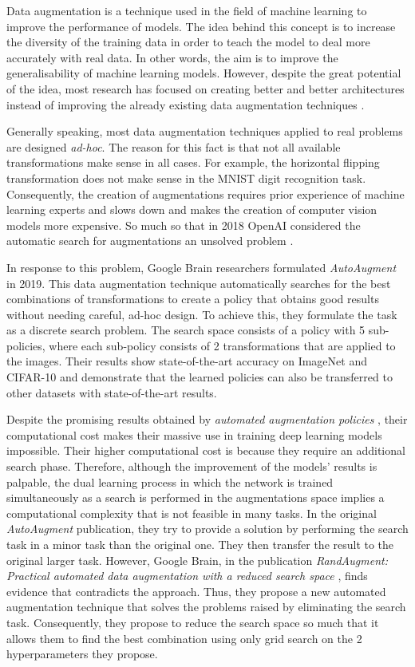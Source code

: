 Data augmentation is a technique used in the field of machine learning to improve the performance of models. The idea behind this concept is to increase the diversity of the training data in order to teach the model to deal more accurately with real data. In other words, the aim is to improve the generalisability of machine learning models. However, despite the great potential of the idea, most research has focused on creating better and better architectures instead of improving the already existing data augmentation techniques \cite{cubuk2018autoaugment}.

Generally speaking, most data augmentation techniques applied to real problems are designed \textit{ad-hoc}. The reason for this fact is that not all available transformations make sense in all cases. For example, the horizontal flipping transformation does not make sense in the MNIST digit recognition task. Consequently, the creation of augmentations requires prior experience of machine learning experts and slows down and makes the creation of computer vision models more expensive. So much so that in 2018 OpenAI considered the automatic search for augmentations an unsolved problem \cite{requestsresearch}.

In response to this problem, Google Brain researchers formulated \textit{AutoAugment} \cite{cubuk2018autoaugment} in 2019. This data augmentation technique automatically searches for the best combinations of transformations to create a policy that obtains good results without needing careful, ad-hoc design. To achieve this, they formulate the task as a discrete search problem. The search space consists of a policy with 5 sub-policies, where each sub-policy consists of 2 transformations that are applied to the images. Their results show state-of-the-art accuracy on ImageNet and CIFAR-10 and demonstrate that the learned policies can also be transferred to other datasets with state-of-the-art results.

Despite the promising results obtained by \textit{automated augmentation policies} \cite{cubuk2018autoaugment}, their computational cost makes their massive use in training deep learning models impossible. Their higher computational cost is because they require an additional search phase. Therefore, although the improvement of the models' results is palpable, the dual learning process in which the network is trained simultaneously as a search is performed in the augmentations space implies a computational complexity that is not feasible in many tasks. In the original \textit{AutoAugment} publication, they try to provide a solution by performing the search task in a minor task than the original one. They then transfer the result to the original larger task. However, Google Brain, in the publication \textit{RandAugment: Practical automated data augmentation with a reduced search space} \cite{cubuk2020randaugment}, finds evidence that contradicts the approach. Thus, they propose a new automated augmentation technique that solves the problems raised by eliminating the search task. Consequently, they propose to reduce the search space so much that it allows them to find the best combination using only grid search on the 2 hyperparameters they propose.

